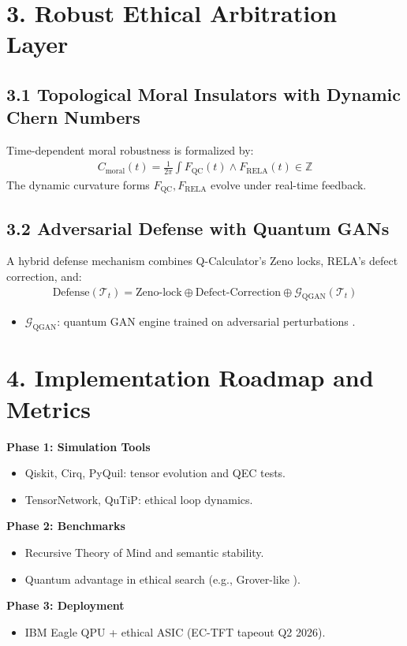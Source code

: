\documentclass[12pt]{article}
\begin{document}
\section*{3. Robust Ethical Arbitration Layer}
\subsection*{3.1 Topological Moral Insulators with Dynamic Chern Numbers}
Time-dependent moral robustness is formalized by:
\begin{align}
C_{\text{moral}}(t) = \frac{1}{2\pi} \int F_{\text{QC}}(t) \wedge F_{\text{RELA}}(t) \in \mathbb{Z}
\end{align}
The dynamic curvature forms $F_{\text{QC}}, F_{\text{RELA}}$ evolve under real-time feedback.

\subsection*{3.2 Adversarial Defense with Quantum GANs}
A hybrid defense mechanism combines Q-Calculator’s Zeno locks, RELA’s defect correction, and:
\begin{align}
\text{Defense}(\mathcal{T}_t) = \text{Zeno-lock} \oplus \text{Defect-Correction} \oplus \mathcal{G}_{\text{QGAN}}(\mathcal{T}_t)
\end{align}
\begin{itemize}
  \item $\mathcal{G}_{\text{QGAN}}$: quantum GAN engine trained on adversarial perturbations \cite{lee2023quantum}.
\end{itemize}

\section*{4. Implementation Roadmap and Metrics}
\textbf{Phase 1: Simulation Tools}
\begin{itemize}
  \item Qiskit, Cirq, PyQuil: tensor evolution and QEC tests.
  \item TensorNetwork, QuTiP: ethical loop dynamics.
\end{itemize}
\textbf{Phase 2: Benchmarks}
\begin{itemize}
  \item Recursive Theory of Mind and semantic stability.
  \item Quantum advantage in ethical search (e.g., Grover-like \cite{grover1996fast}).
\end{itemize}
\textbf{Phase 3: Deployment}
\begin{itemize}
  \item IBM Eagle QPU + ethical ASIC (EC-TFT tapeout Q2 2026).
\end{itemize}



\end{document}
